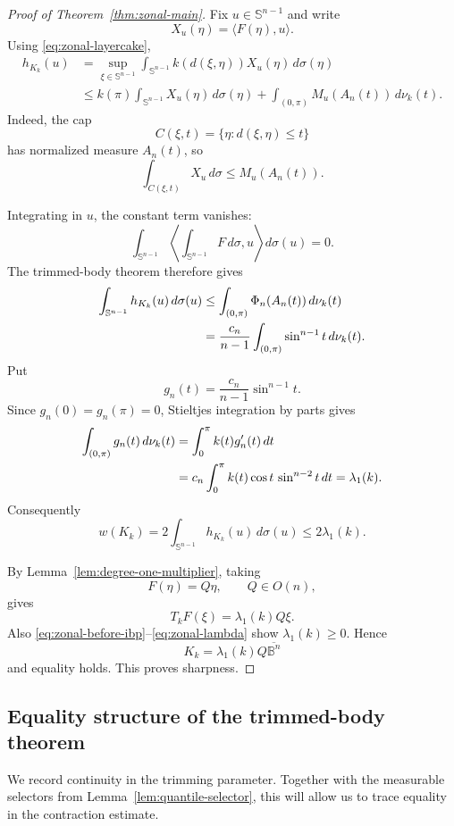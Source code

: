 \documentclass[11pt,reqno]{amsart}
\theoremstyle{remark}
\begin{document}
\begin{proof}[Proof of Theorem~\ref{thm:zonal-main}]
Fix $u\in\mathbb S^{n-1}$ and write
\[
 X_u(\eta)=\langle F(\eta),u\rangle.
\]
Using \eqref{eq:zonal-layercake},
\begin{align*}
 h_{K_k}(u)
 &=
 \sup_{\xi\in\mathbb S^{n-1}}
 \int_{\mathbb S^{n-1}} k(d(\xi,\eta))X_u(\eta)\,d\sigma(\eta)\\
 &\le
 k(\pi)\int_{\mathbb S^{n-1}} X_u(\eta)\,d\sigma(\eta)
 +
 \int_{(0,\pi)}
 M_u(A_n(t))\,d\nu_k(t).
\end{align*}
Indeed, the cap
\[
 C(\xi,t)=\{\eta:d(\xi,\eta)\le t\}
\]
has normalized measure $A_n(t)$, so
\[
 \int_{C(\xi,t)}X_u\,d\sigma
 \le M_u(A_n(t)).
\]

Integrating in $u$, the constant term vanishes:
\[
 \int_{\mathbb S^{n-1}}
 \left\langle
 \int_{\mathbb S^{n-1}}F\,d\sigma,u
 \right\rangle d\sigma(u)=0.
\]
The trimmed-body theorem therefore gives
\begin{align}
 \int_{\mathbb S^{n-1}}h_{K_k}(u)\,d\sigma(u)
 &\le
 \int_{(0,\pi)}
 \Phi_n(A_n(t))\,d\nu_k(t)\notag\\
 &=
 \frac{c_n}{n-1}
 \int_{(0,\pi)}
 \sin^{n-1}t\,d\nu_k(t).
\label{eq:zonal-before-ibp}
\end{align}
Put
\[
 g_n(t)=\frac{c_n}{n-1}\sin^{n-1}t.
\]
Since $g_n(0)=g_n(\pi)=0$, Stieltjes integration by parts gives
\begin{align}
 \int_{(0,\pi)}g_n(t)\,d\nu_k(t)
 &=
 \int_0^\pi k(t)g_n'(t)\,dt\notag\\
 &=
 c_n\int_0^\pi
 k(t)\cos t\,\sin^{n-2}t\,dt
 =
 \lambda_1(k).
\label{eq:zonal-lambda}
\end{align}
Consequently
\[
 w(K_k)
 =
 2\int_{\mathbb S^{n-1}} h_{K_k}(u)\,d\sigma(u)
 \le2\lambda_1(k).
\]

By Lemma~\ref{lem:degree-one-multiplier}, taking
\[
 F(\eta)=Q\eta,\qquad Q\in O(n),
\]
gives
\[
 T_kF(\xi)=\lambda_1(k)Q\xi.
\]
Also \eqref{eq:zonal-before-ibp}--\eqref{eq:zonal-lambda} show
$\lambda_1(k)\ge0$.  Hence
\[
 K_k=\lambda_1(k)Q\overline{\mathbb B^n}
\]
and equality holds.  This proves sharpness.
\end{proof}

\subsection{Equality structure of the trimmed-body theorem}

We record continuity in the trimming parameter.  Together with the
measurable selectors from Lemma~\ref{lem:quantile-selector}, this will
allow us to trace equality in the contraction estimate.
\end{document}

